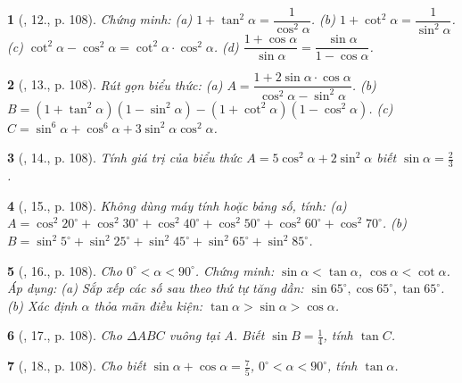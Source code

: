 \documentclass{article}
\newtheorem{baitoan}{}
\begin{document}
\begin{baitoan}[\cite{Tuyen_Toan_9_old}, 12., p. 108]
	Chứng minh: (a) $1 + \tan^2\alpha = \dfrac{1}{\cos^2\alpha}$. (b) $1 + \cot^2\alpha = \dfrac{1}{\sin^2\alpha}$. (c) $\cot^2\alpha - \cos^2\alpha = \cot^2\alpha\cdot\cos^2\alpha$. (d) $\dfrac{1 + \cos\alpha}{\sin\alpha} = \dfrac{\sin\alpha}{1 - \cos\alpha}$.
\end{baitoan}

\begin{baitoan}[\cite{Tuyen_Toan_9_old}, 13., p. 108]
	Rút gọn biểu thức: (a) $A = \dfrac{1 + 2\sin\alpha\cdot\cos\alpha}{\cos^2\alpha - \sin^2\alpha}$. (b) $B = (1 + \tan^2\alpha)(1 - \sin^2\alpha) - (1 + \cot^2\alpha)(1 - \cos^2\alpha)$. (c) $C = \sin^6\alpha + \cos^6\alpha + 3\sin^2\alpha\cos^2\alpha$.
\end{baitoan}

\begin{baitoan}[\cite{Tuyen_Toan_9_old}, 14., p. 108]
	Tính giá trị của biểu thức $A = 5\cos^2\alpha + 2\sin^2\alpha$ biết $\sin\alpha = \frac{2}{3}$.
\end{baitoan}

\begin{baitoan}[\cite{Tuyen_Toan_9_old}, 15., p. 108]
	Không dùng máy tính hoặc bảng số, tính: (a) $A = \cos^2 20^\circ + \cos^2 30^\circ + \cos^2 40^\circ + \cos^2 50^\circ + \cos^2 60^\circ + \cos^2 70^\circ$. (b) $B = \sin^2 5^\circ + \sin^2 25^\circ + \sin^2 45^\circ + \sin^2 65^\circ + \sin^2 85^\circ$.
\end{baitoan}

\begin{baitoan}[\cite{Tuyen_Toan_9_old}, 16., p. 108]
	Cho $0^\circ < \alpha < 90^\circ$. Chứng minh: $\sin\alpha < \tan\alpha$, $\cos\alpha < \cot\alpha$. Áp dụng: (a) Sắp xếp các số sau theo thứ tự tăng dần: $\sin 65^\circ,\cos 65^\circ,\tan 65^\circ$. (b) Xác định $\alpha$ thỏa mãn điều kiện: $\tan\alpha > \sin\alpha > \cos\alpha$.
\end{baitoan}

\begin{baitoan}[\cite{Tuyen_Toan_9_old}, 17., p. 108]
	Cho $\Delta ABC$ vuông tại $A$. Biết $\sin B = \frac{1}{4}$, tính $\tan C$.
\end{baitoan}

\begin{baitoan}[\cite{Tuyen_Toan_9_old}, 18., p. 108]
	Cho biết $\sin\alpha + \cos\alpha = \frac{7}{5}$, $0^\circ < \alpha < 90^\circ$, tính $\tan\alpha$.
\end{baitoan}
\end{document}
